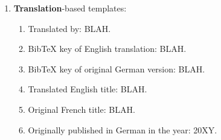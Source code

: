 \documentclass[letter,12pt]{article}
\begin{document}
\begin{enumerate}
\begin{enumerate}
\begin{enumerate}
		\item Deprecated templates: \vspace{-0.1cm}
			\begin{enumerate} \itemsep -1pt
			\item Originally published by BLAH in BLAH--BLAH.
			\item Also, published by BLAH in BLAH--BLAH.
			\end{enumerate}
		\end{enumerate}
	\item Prepublication information: \vspace{-0.2cm}
		\begin{enumerate} \itemsep -2pt
		\item BibTeX entry completed with very limited prepublication information. This needs to be updated.
		\end{enumerate}
	\item Retracted/Withdrawn publications: \vspace{-0.2cm}
		\begin{enumerate} \itemsep -2pt
		\item Retracted/withdrawn publication.
		\item Include the following keyphrases in the {\tt Keywords} {\sc Bib}\TeX\ field to indicate that the publication has been retracted/withdrawn, so that searching for such publications in the {\sc Bib}\TeX\ database can be facilitated: \vspace{-0.1cm}
			\begin{enumerate} \itemsep -1pt
			\item books - retracted
			\item retracted books
			\end{enumerate}
		\end{enumerate}
	\end{enumerate}
\item {\bf Translation}-based templates: \vspace{-0.3cm}
	\begin{enumerate} \itemsep -2pt
	\item Translated by: BLAH.
	\item BibTeX key of English translation: BLAH.
	\item BibTeX key of original German version: BLAH.
	\item Translated English title: BLAH.
	\item Original French title: BLAH.
	\item Originally published in German in the year: 20XY.

\end{enumerate}
\end{enumerate}
\end{document}
